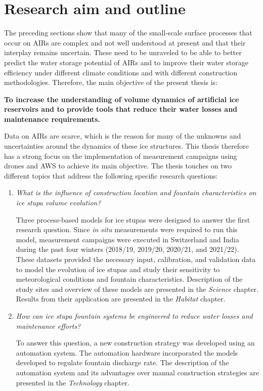 \section{Research aim and outline}

The preceding sections show that many of the small-scale surface processes that occur on \ac{AIRs} are complex
and not well understood at present and that their interplay remains uncertain. These need to be unraveled to be able to better predict the
water storage potential of \ac{AIRs} and to improve their water storage efficiency under different climate conditions and with different
construction methodologies. Therefore, the main objective of the present thesis is:

\begin{thesis_quotation}

  \textbf{To increase the understanding of volume dynamics of artificial ice reservoirs and to
  provide tools that reduce their water losses and maintenance requirements.}

\end{thesis_quotation}

Data on \ac{AIRs} are scarce, which is the reason for many of the unknowns and uncertainties around the dynamics
of these ice structures. This thesis therefore has a strong focus on the implementation of measurement campaigns
using drones and \ac{AWS} to achieve its main objective. The thesis touches on two different topics that
address the following specific research questions:

\begin{enumerate}

  \item \textit{What is the influence of construction location and fountain characteristics on ice stupa volume
    evolution?}

Three process-based models for ice stupas were designed to answer the first research question. Since \textit{in situ}
    measurements were required to run this model, measurement campaigns were executed in Switzerland and India
    during the past four winters (2018/19, 2019/20, 2020/21, and 2021/22). These datasets provided the necessary
    input, calibration, and validation data to model the evolution of ice stupas and study their sensitivity to
    meteorological conditions and fountain characteristics. Description of the study sites and overview of these
    models are presented in the \textit{Science} chapter. Results from their application are presented in the
    \textit{Habitat} chapter.

  \item \textit{How can ice stupa fountain systems be engineered to reduce water losses and maintenance
    efforts?}

To answer this question, a new construction strategy was developed using an automation system. The automation
    hardware incorporated the models developed to regulate fountain discharge rate. The description of the
    automation system and its advantages over manual construction strategies are presented in the
    \textit{Technology} chapter.

\end{enumerate}

